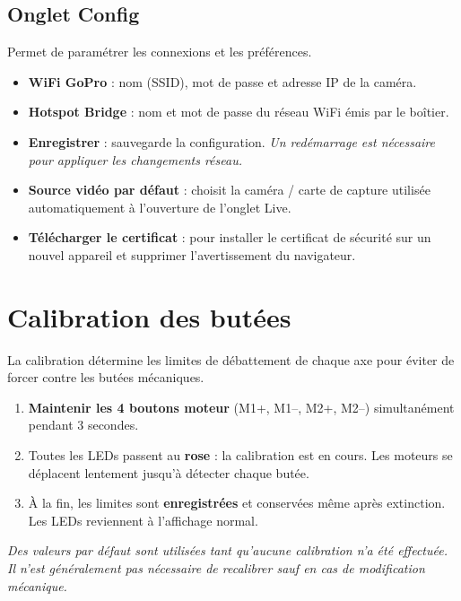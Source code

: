 \documentclass[11pt,a4paper]{article}
\begin{document}
\subsection{Onglet Config}

Permet de paramétrer les connexions et les préférences.

\begin{itemize}[leftmargin=*]
  \item \textbf{WiFi GoPro} : nom (SSID), mot de passe et adresse IP de la caméra.
  \item \textbf{Hotspot Bridge} : nom et mot de passe du réseau WiFi émis par le
        boîtier.
  \item \textbf{Enregistrer} : sauvegarde la configuration. \emph{Un redémarrage
        est nécessaire pour appliquer les changements réseau.}
  \item \textbf{Source vidéo par défaut} : choisit la caméra / carte de capture
        utilisée automatiquement à l'ouverture de l'onglet Live.
  \item \textbf{Télécharger le certificat} : pour installer le certificat de
        sécurité sur un nouvel appareil et supprimer l'avertissement du
        navigateur.
\end{itemize}

\section{Calibration des butées}

La calibration détermine les limites de débattement de chaque axe pour éviter de
forcer contre les butées mécaniques.

\begin{enumerate}[leftmargin=*]
  \item \textbf{Maintenir les 4 boutons moteur} (M1+, M1--, M2+, M2--)
        simultanément pendant 3 secondes.
  \item Toutes les LEDs passent au \textbf{rose} : la calibration est en cours.
        Les moteurs se déplacent lentement jusqu'à détecter chaque butée.
  \item À la fin, les limites sont \textbf{enregistrées} et conservées même après
        extinction. Les LEDs reviennent à l'affichage normal.
\end{enumerate}

\noindent
\textit{Des valeurs par défaut sont utilisées tant qu'aucune calibration n'a été
effectuée. Il n'est généralement pas nécessaire de recalibrer sauf en cas de
modification mécanique.}
\end{document}
